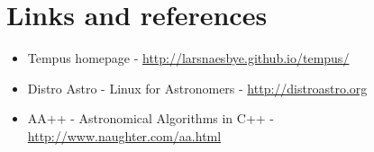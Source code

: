 \section{Links and references}

\begin{itemize}
    \item Tempus homepage - \url{http://larsnaesbye.github.io/tempus/}
    \item Distro Astro - Linux for Astronomers - \url{http://distroastro.org}
    \item AA++ - Astronomical Algorithms in C++ - \url{http://www.naughter.com/aa.html}
\end{itemize}
